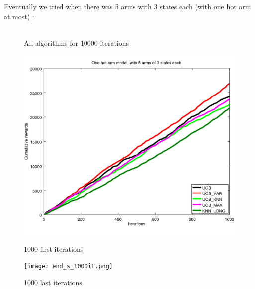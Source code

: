 \documentclass{article} %
\begin{document}
Eventually we tried when there was 5 arms with 3 states each (with one hot arm at most) : 

\begin{figure}[h]
	\begin{center}
		\includegraphics[width=1.0]{all_s_10000it.png}
	\end{center}
	\caption{All algorithms for 10000 iterations}
\end{figure}

\begin{figure}[h]
	\begin{minipage}[b]{.48\linewidth}
		\includegraphics[width=1.0\textwidth]{begin_s_1000it.png}
		\caption{1000 first iterations}
	\end{minipage}
	\hfill
	\begin{minipage}[b]{0.48\linewidth}
		\texttt{[image: end\_s\_1000it.png]}
		\caption{1000 last iterations}
	\end{minipage}
	\label{fig:f}
\end{figure}
\end{document}
